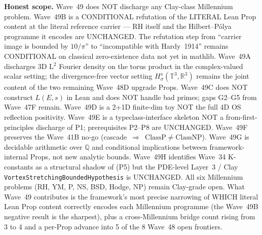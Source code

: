 \begin{remark}
\textbf{Honest scope.} Wave~49 does NOT discharge any Clay-class Millennium problem. Wave~49B is a CONDITIONAL refutation of the LITERAL Lean Prop content at the literal reference carrier --- RH itself and the Hilbert--P\'olya programme it encodes are UNCHANGED. The refutation step from ``carrier image is bounded by $10/\pi$'' to ``incompatible with Hardy~1914'' remains CONDITIONAL on classical zero-existence data not yet in mathlib. Wave~49A discharges 3D L$^2$ Fourier density on the torus product in the complex-valued scalar setting; the divergence-free vector setting $H^s_\sigma(\mathbb{T}^3, \mathbb{R}^3)$ remains the joint content of the two remaining Wave~48D upgrade Props. Wave~49C does NOT construct $L(E, s)$ in Lean and does NOT handle bad primes; gaps G2--G5 from Wave~47F remain. Wave~49D is a 2+1D finite-dim toy NOT the full 4D OS reflection positivity. Wave~49E is a typeclass-interface skeleton NOT a from-first-principles discharge of P1; prerequisites P2--P8 are UNCHANGED. Wave~49F preserves the Wave~41B no-go (cascade~$\Rightarrow$~$\mathrm{ClassP} \neq \mathrm{ClassNP}$). Wave~49G is decidable arithmetic over $\mathbb{Q}$ and conditional implications between framework-internal Props, not new analytic bounds. Wave~49H identifies Wave~34 K-constants as a structural shadow of (P5) but the PDE-level Layer~3 / Clay \texttt{VortexStretchingBoundedHypothesis} is UNCHANGED. All six Millennium problems (RH, YM, P, NS, BSD, Hodge, NP) remain Clay-grade open. What Wave~49 contributes is the framework's most precise narrowing of WHICH literal Lean Prop content correctly encodes each Millennium programme (the Wave~49B negative result is the sharpest), plus a cross-Millennium bridge count rising from 3 to 4 and a per-Prop advance into 5 of the 8 Wave~48 open frontiers.
\end{remark}

